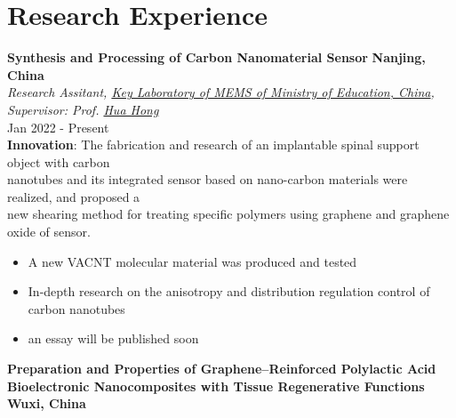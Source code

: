 \documentclass[letterpaper,11pt]{article}
\begin{document}

\section{\textbf{Research Experience}}

{\bf Synthesis and Processing of Carbon Nanomaterial Sensor} \hfill{\textbf{Nanjing, China}}\\

\textit{Research Assitant, {\href{https://mems.seu.edu.cn/main.htm}{Key Laboratory of MEMS of Ministry of Education, China}}, Supervisor: Prof. {\href{https://ic.seu.edu.cn/honghua/main.htm}{Hua Hong}}}
\\
\hfill{Jan 2022 - Present}
\\

\textbf{Innovation}: The fabrication and research of an implantable spinal support object with carbon\\
\hspace{63pt} nanotubes and its integrated sensor based on nano-carbon materials were realized, and proposed a \\
\hspace{63pt} new shearing method for treating specific polymers using graphene and graphene oxide of sensor.
\begin{itemize}
    \item A new VACNT molecular material was produced and tested
    \item In-depth research on the anisotropy and  distribution regulation control of carbon nanotubes 
    \item an essay will be published soon
\end{itemize}
\vspace{2pt}

{\bf Preparation and Properties of Graphene–Reinforced Polylactic Acid Bioelectronic Nanocomposites with Tissue Regenerative Functions} \hfill{\textbf{Wuxi, China}}\\
\end{document}
